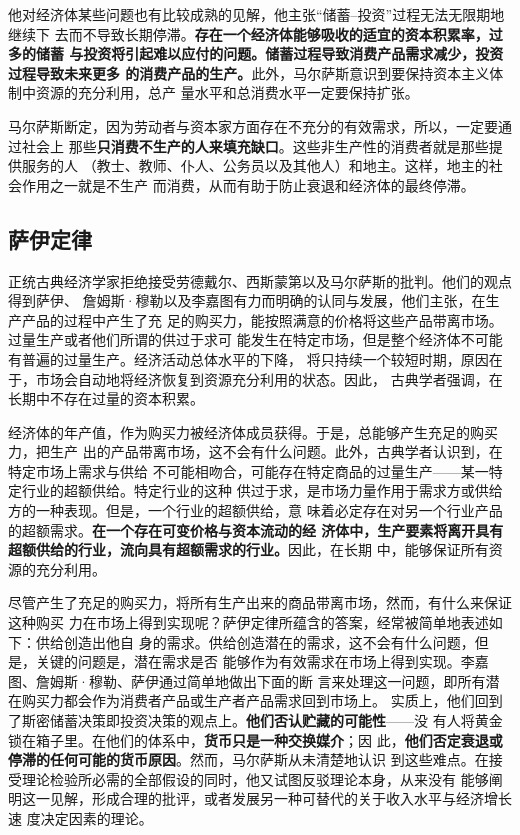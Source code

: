 他对经济体某些问题也有比较成熟的见解，他主张“储蓄--投资”过程无法无限期地继续下
去而不导致长期停滞。\textbf{存在一个经济体能够吸收的适宜的资本积累率，过多的储蓄
  与投资将引起难以应付的问题。储蓄过程导致消费产品需求减少，投资过程导致未来更多
  的消费产品的生产。}此外，马尔萨斯意识到要保持资本主义体制中资源的充分利用，总产
量水平和总消费水平一定要保持扩张。

马尔萨斯断定，因为劳动者与资本家方面存在不充分的有效需求，所以，一定要通过社会上
那些\textbf{只消费不生产的人来填充缺口}。这些非生产性的消费者就是那些提供服务的人
（教士、教师、仆人、公务员以及其他人）和地主。这样，地主的社会作用之一就是不生产
而消费，从而有助于防止衰退和经济体的最终停滞。

\subsection{萨伊定律}

正统古典经济学家拒绝接受劳德戴尔、西斯蒙第以及马尔萨斯的批判。他们的观点得到萨伊、
詹姆斯·穆勒以及李嘉图有力而明确的认同与发展，他们主张，在生产产品的过程中产生了充
足的购买力，能按照满意的价格将这些产品带离市场。过量生产或者他们所谓的供过于求可
能发生在特定市场，但是整个经济体不可能有普遍的过量生产。经济活动总体水平的下降，
将只持续一个较短时期，原因在于，市场会自动地将经济恢复到资源充分利用的状态。因此，
古典学者强调，在长期中不存在过量的资本积累。

经济体的年产值，作为购买力被经济体成员获得。于是，总能够产生充足的购买力，把生产
出的产品带离市场，这不会有什么问题。此外，古典学者认识到，在特定市场上需求与供给
不可能相吻合，可能存在特定商品的过量生产——某一特定行业的超额供给。特定行业的这种
供过于求，是市场力量作用于需求方或供给方的一种表现。但是，一个行业的超额供给，意
味着必定存在对另一个行业产品的超额需求。\textbf{在一个存在可变价格与资本流动的经
  济体中，生产要素将离开具有超额供给的行业，流向具有超额需求的行业。}因此，在长期
中，能够保证所有资源的充分利用。

尽管产生了充足的购买力，将所有生产出来的商品带离市场，然而，有什么来保证这种购买
力在市场上得到实现呢？萨伊定律所蕴含的答案，经常被简单地表述如下：供给创造出他自
身的需求。供给创造潜在的需求，这不会有什么问题，但是，关键的问题是，潜在需求是否
能够作为有效需求在市场上得到实现。李嘉图、詹姆斯·穆勒、萨伊通过简单地做出下面的断
言来处理这一问题，即所有潜在购买力都会作为消费者产品或生产者产品需求回到市场上。
实质上，他们回到了斯密储蓄决策即投资决策的观点上。\textbf{他们否认贮藏的可能性}——没
有人将黄金锁在箱子里。在他们的体系中，\textbf{货币只是一种交换媒介}；因
此，\textbf{他们否定衰退或停滞的任何可能的货币原因}。然而，马尔萨斯从未清楚地认识
到这些难点。在接受理论检验所必需的全部假设的同时，他又试图反驳理论本身，从来没有
能够阐明这一见解，形成合理的批评，或者发展另一种可替代的关于收入水平与经济增长速
度决定因素的理论。

